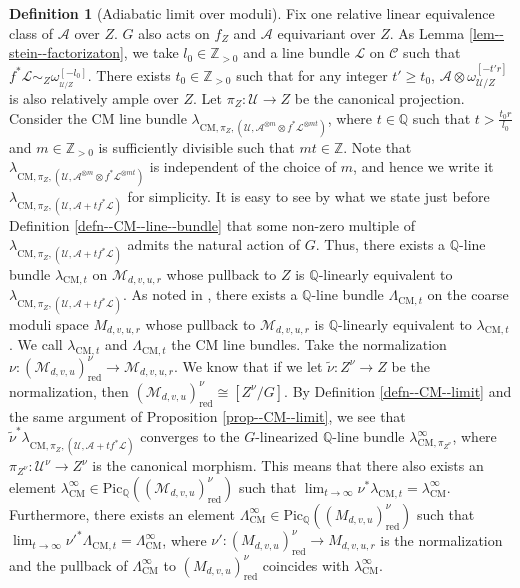 \documentclass[12pt,twoside]{amsart}
\theoremstyle{definition}
\newtheorem{defn}[thm]{Definition}
\begin{document}
\begin{defn}[Adiabatic limit over moduli]\label{defn--limit--CM} 
Fix one relative linear equivalence class of $\mathcal{A}$ over $Z$.
$G$ also acts on $f_Z$ and $\mathcal{A}$ equivariant over $Z$.
As Lemma \ref{lem--stein--factorizaton}, we take $l_0\in\mathbb{Z}_{>0}$ and a line bundle $\mathscr{L}$ on $\mathcal{C}$ such that $f^*\mathscr{L}\sim_Z \omega_{_{\mathcal{U}/Z}}^{[-l_0]}$. 
There exists $t_0\in\mathbb{Z}_{>0}$ such that for any integer $t'\ge t_0$, $\mathcal{A}\otimes \omega^{[-t'r]}_{\mathcal{U}/Z}$ is also relatively ample over $Z$.
Let $\pi_Z\colon \mathcal{U}\to Z$ be the canonical projection.
Consider the CM line bundle $\lambda_{\mathrm{CM},\pi_{Z},(\mathcal{U},\mathcal{A}^{\otimes m}\otimes f^*\mathscr{L}^{\otimes mt})}$, where $t\in\mathbb{Q}$ such that $t>\frac{t_0r}{l_0}$ and $m\in\mathbb{Z}_{>0}$ is sufficiently divisible such that $mt\in\mathbb{Z}$.
Note that $\lambda_{\mathrm{CM},\pi_{Z},(\mathcal{U},\mathcal{A}^{\otimes m}\otimes f^*\mathscr{L}^{\otimes mt})}$ is independent of the choice of $m$, and hence we write it  $\lambda_{\mathrm{CM},\pi_{Z},(\mathcal{U},\mathcal{A}+tf^*\mathscr{L})}$ for simplicity.
It is easy to see by what we state just before Definition \ref{defn--CM--line--bundle} that some non-zero multiple of $\lambda_{\mathrm{CM},\pi_{Z},(\mathcal{U},\mathcal{A}+tf^*\mathscr{L})}$ admits the natural action of $G$. 
Thus, there exists a $\mathbb{Q}$-line bundle $\lambda_{\mathrm{CM},t}$ on $\mathcal{M}_{d,v,u,r}$ whose pullback to $Z$ is $\mathbb{Q}$-linearly equivalent to $\lambda_{\mathrm{CM},\pi_{Z},(\mathcal{U},\mathcal{A}+tf^*\mathscr{L})}$.
As noted in \cite[Subsection 3.2]{Hat23}, there exists a $\mathbb{Q}$-line bundle $\Lambda_{\mathrm{CM},t}$ on the coarse moduli space $M_{d,v,u,r}$ whose pullback to $\mathcal{M}_{d,v,u,r}$ is $\mathbb{Q}$-linearly equivalent to $\lambda_{\mathrm{CM},t}$.
We call $\lambda_{\mathrm{CM},t}$ and $\Lambda_{\mathrm{CM},t}$  the CM line bundles.
Take the normalization $\nu\colon(\mathcal{M}_{d,v,u})_{\mathrm{red}}^\nu\to\mathcal{M}_{d,v,u,r}$.
We know that if we let $\tilde{\nu}\colon Z^\nu\to Z$ be the normalization, then $(\mathcal{M}_{d,v,u})_{\mathrm{red}}^\nu\cong[Z^\nu/G]$.
By Definition \ref{defn--CM--limit} and the same argument of Proposition \ref{prop--CM--limit}, we see that $\tilde{\nu}^*\lambda_{\mathrm{CM},\pi_{Z},(\mathcal{U},\mathcal{A}+tf^*\mathscr{L})}$ converges to the $G$-linearized $\mathbb{Q}$-line bundle $\lambda^\infty_{\mathrm{CM},\pi_{Z^\nu}}$, where $\pi_{Z^\nu}\colon \mathcal{U}^\nu\to Z^\nu$ is the canonical morphism.
This means that there also exists an element $\lambda^\infty_{\mathrm{CM}}\in \mathrm{Pic}_{\mathbb{Q}}((\mathcal{M}_{d,v,u})_{\mathrm{red}}^\nu)$ such that $\lim_{t\to\infty}\nu^*\lambda_{\mathrm{CM},t}=\lambda^\infty_{\mathrm{CM}}$.
Furthermore, there exists an element $\Lambda^\infty_{\mathrm{CM}}\in \mathrm{Pic}_{\mathbb{Q}}((M_{d,v,u})_{\mathrm{red}}^\nu)$ such that $\lim_{t\to\infty}\nu'^*\Lambda_{\mathrm{CM},t}=\Lambda^\infty_{\mathrm{CM}}$, where $\nu'\colon (M_{d,v,u})_{\mathrm{red}}^\nu \to M_{d,v,u,r}$ is the normalization and the pullback of $\Lambda^\infty_{\mathrm{CM}}$ to $(M_{d,v,u})_{\mathrm{red}}^\nu$ coincides with $\lambda^\infty_{\mathrm{CM}}$.



\end{defn}
\end{document}
